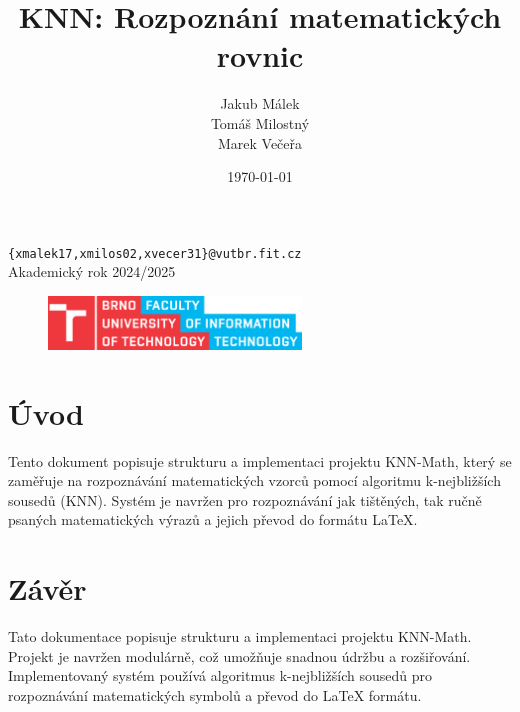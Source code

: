 \documentclass[12pt,a4paper]{article}
\title{KNN: Rozpoznání matematických rovnic}
\author{Jakub Málek\\Tomáš Milostný\\Marek Večeřa}
\date{\today}
\begin{document}
\maketitle
\thispagestyle{empty}   %

\begin{center}
    \large \texttt{\{xmalek17,xmilos02,xvecer31\}@vutbr.fit.cz}\\[1ex]
    \normalsize Akademický rok 2024/2025
\end{center}

\vspace{10cm}
\begin{figure}[H]
    \centering
    \includegraphics[width=0.6\textwidth]{img/FIT_color_CMYK_EN.eps}
\end{figure}


\newpage
\tableofcontents

\newpage
\section{Úvod}

Tento dokument popisuje strukturu a implementaci projektu KNN-Math, který se zaměřuje na rozpoznávání matematických vzorců pomocí algoritmu k-nejbližších sousedů (KNN). Systém je navržen pro rozpoznávání jak tištěných, tak ručně psaných matematických výrazů a jejich převod do formátu LaTeX.

\newpage


\section{Závěr}

Tato dokumentace popisuje strukturu a implementaci projektu KNN-Math. Projekt je navržen modulárně, což umožňuje snadnou údržbu a rozšiřování. Implementovaný systém používá algoritmus k-nejbližších sousedů pro rozpoznávání matematických symbolů a převod do LaTeX formátu.

\newpage
\nocite{*}  %
\printbibliography[heading=bibintoc, title={Zdroje}]
\end{document}

